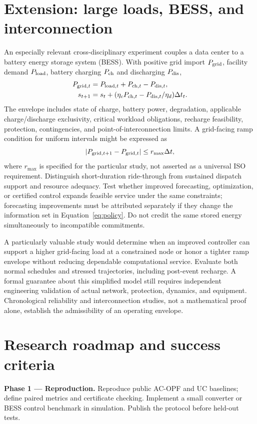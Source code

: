 \documentclass[11pt,letterpaper]{article}
\begin{document}
\section{Extension: large loads, BESS, and interconnection}
An especially relevant cross-disciplinary experiment couples a data center to a battery energy storage system (BESS). With positive grid import $P_{\rm grid}$, facility demand $P_{\rm load}$, battery charging $P_{\rm ch}$ and discharging $P_{\rm dis}$,
\begin{align}
P_{{\rm grid},t}&=P_{{\rm load},t}+P_{{\rm ch},t}-P_{{\rm dis},t},\\
s_{t+1}&=s_t+(\eta_cP_{{\rm ch},t}-P_{{\rm dis},t}/\eta_d)\Delta t_t.
\end{align}
The envelope includes state of charge, battery power, degradation, applicable charge/discharge exclusivity, critical workload obligations, recharge feasibility, protection, contingencies, and point-of-interconnection limits. A grid-facing ramp condition for uniform intervals might be expressed as
\begin{equation}
|P_{{\rm grid},t+1}-P_{{\rm grid},t}|\leq r_{\max}\Delta t,
\end{equation}
where $r_{\max}$ is specified for the particular study, not asserted as a universal ISO requirement. Distinguish short-duration ride-through from sustained dispatch support and resource adequacy. Test whether improved forecasting, optimization, or certified control expands feasible service under the same constraints; forecasting improvements must be attributed separately if they change the information set in Equation~\ref{eq:policy}. Do not credit the same stored energy simultaneously to incompatible commitments.

A particularly valuable study would determine when an improved controller can support a higher grid-facing load at a constrained node or honor a tighter ramp envelope without reducing dependable computational service. Evaluate both normal schedules and stressed trajectories, including post-event recharge. A formal guarantee about this simplified model still requires independent engineering validation of actual network, protection, dynamics, and equipment. Chronological reliability and interconnection studies, not a mathematical proof alone, establish the admissibility of an operating envelope.

\section{Research roadmap and success criteria}
\textbf{Phase 1 --- Reproduction.} Reproduce public AC-OPF and UC baselines; define paired metrics and certificate checking. Implement a small converter or BESS control benchmark in simulation. Publish the protocol before held-out tests.
\end{document}
